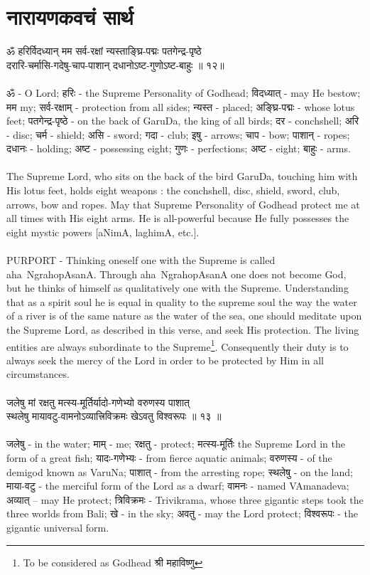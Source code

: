 \section{\color{blue}\sanskrit नारायणकवचं सार्थ}
\sanskrit
ॐ हरिर्विदध्यान् मम सर्व-रक्षां न्यस्ताङ्घ्रि-पद्मः पतगेन्द्र-पृष्ठे\\
दरारि-चर्मासि-गदेषु-चाप-पाशान् दधानोऽष्ट-गुणोऽष्ट-बाहुः ॥ १२॥\\
\\
ॐ - O Lord;  हरिः - the Supreme Personality of Godhead;  विदध्यात् - may He bestow;  मम  my;  सर्व-रक्षाम् - protection from all sides;  न्यस्त - placed;  अङ्घ्रि-पद्मः - whose lotus feet; पतगेन्द्र-पृष्ठे - on the back of GaruDa, the king of all birds; दर - conchshell;  अरि -   disc;  चर्म - shield;  असि - sword;  गदा - club;  इषु - arrows;  चाप - bow;  पाशान् - ropes;  दधानः - holding;  अष्ट - possessing eight;  गुणः - perfections;  अष्ट - eight;  बाहुः - arms.\\
\\
The Supreme Lord, who sits on the back of the bird GaruDa, touching him with His lotus feet, holds eight weapons : the conchshell, disc, shield, sword, club, arrows, bow and ropes. May that Supreme Personality of Godhead protect me at all times with His eight arms. He is all-powerful because He fully possesses the eight mystic powers [aNimA, laghimA, etc.].\\
\\
\footnotesize PURPORT - Thinking oneself one with the Supreme is called aha~NgrahopAsanA. Through aha~NgrahopAsanA one does not become God, but he thinks of himself as qualitatively one with the Supreme. Understanding that as a spirit soul he is equal in quality to the supreme soul the way the water of a river is of the same nature as the water of the sea, one should meditate upon the Supreme Lord, as described in this verse, and seek His protection. The living entities are always subordinate to the Supreme\footnote{To be considered as Godhead {\sanskrit  श्री महाविष्णु}}. Consequently their duty is to always seek the mercy of the Lord in order to be protected by Him in all circumstances.\\
\normalsize
\\
जलेषु मां रक्षतु मत्स्य-मूर्तिर्यादो-गणेभ्यो वरुणस्य पाशात्\\
स्थलेषु मायावटु-वामनोऽव्यात्त्रिविक्रमः खेऽवतु विश्वरूपः ॥ १३ ॥\\
\\
जलेषु - in the water;  माम् - me;  रक्षतु - protect;  मत्स्य-मूर्तिः  the Supreme Lord in the form of a great fish;  यादः-गणेभ्यः - from fierce aquatic animals;  वरुणस्य - of the demigod known as VaruNa;  पाशात् - from the arresting rope; स्थलेषु - on the land;  माया-वटु - the merciful form of the Lord as a dwarf;  वामनः - named VAmanadeva;  अव्यात् – may He protect;  त्रिविक्रमः - Trivikrama, whose three gigantic steps took the three worlds from Bali;  खे - in the sky;  अवतु - may the Lord protect;  विश्वरूपः - the gigantic universal form.\\
